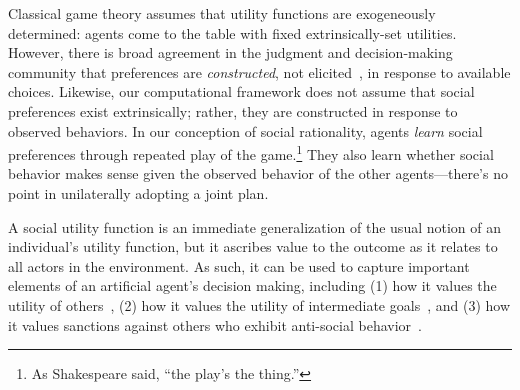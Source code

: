 
Classical game theory assumes that utility functions are exogeneously
determined: agents come to the table with fixed
extrinsically-set utilities.
However, there is broad agreement in the judgment and decision-making
community that preferences are \emph{constructed}, not
elicited~\cite{Payne_Bettman_Johnson_1993}, in response to available
choices.  Likewise, our computational framework does not assume that
social preferences exist extrinsically; rather, they are constructed
in response to observed behaviors.  In our conception of social
rationality, agents \emph{learn\/} social preferences through repeated
play of the game.\footnote{As Shakespeare said, ``the play's the
  thing.''} They also learn whether social behavior makes sense given
the observed behavior of the other agents---there's no point in
unilaterally adopting a joint plan.

A social utility function is an immediate generalization of the usual
notion of an individual's utility function, but it ascribes value to
the outcome as it relates to all actors in the environment.
%
%
As such, it can be used to capture important elements of an artificial
agent's decision making, including (1) how it values the utility of
others~\cite{littman01d}, (2) how it values the utility of
intermediate goals~\cite{macglashan15b}, and (3) how it values
sanctions against others who exhibit anti-social
behavior~\cite{macglashan14c}.

